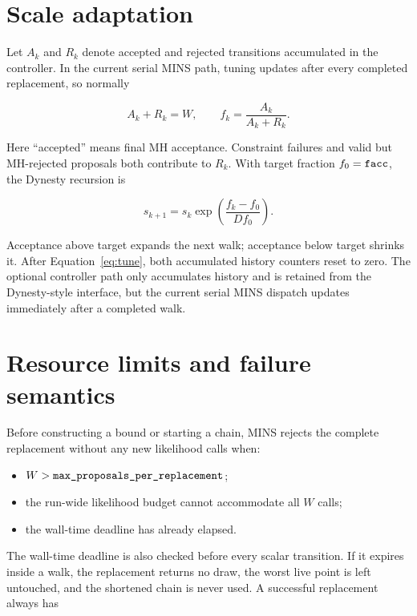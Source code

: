 \documentclass[11pt,a4paper]{article}
\newcommand{\MINS}{\textsc{MINS}}
\newcommand{\code}[1]{\texttt{\detokenize{#1}}}
\begin{document}
\section{Scale adaptation}

Let \(A_k\) and \(R_k\) denote accepted and rejected transitions accumulated
in the controller.  In the current serial \MINS{} path, tuning updates after
every completed replacement, so normally

\begin{equation}
  A_k+R_k=W,
  \qquad
  f_k=\frac{A_k}{A_k+R_k}.
\end{equation}

Here ``accepted'' means final MH acceptance.  Constraint failures and valid
but MH-rejected proposals both contribute to \(R_k\).  With target fraction
\(f_0=\code{facc}\), the Dynesty recursion is

\begin{equation}
  s_{k+1}
  =s_k\exp\left(\frac{f_k-f_0}{D f_0}\right).
  \label{eq:tune}
\end{equation}

Acceptance above target expands the next walk; acceptance below target shrinks
it.  After Equation~\eqref{eq:tune}, both accumulated history counters reset
to zero.  The optional \code{update=False} controller path only accumulates
history and is retained from the Dynesty-style interface, but the current
serial \MINS{} dispatch updates immediately after a completed walk.

\section{Resource limits and failure semantics}

Before constructing a bound or starting a chain, \MINS{} rejects the complete
replacement without any new likelihood calls when:

\begin{itemize}
  \item \(W>\code{max_proposals_per_replacement}\);
  \item the run-wide likelihood budget cannot accommodate all \(W\) calls;
  \item the wall-time deadline has already elapsed.
\end{itemize}

The wall-time deadline is also checked before every scalar transition.  If it
expires inside a walk, the replacement returns no draw, the worst live point
is left untouched, and the shortened chain is never used.  A successful
replacement always has
\end{document}
